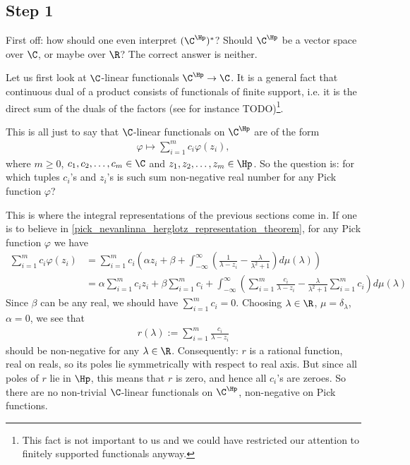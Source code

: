 \subsection{Step 1}\label{step_1}

First off: how should one even interpret $(\C^{\Hp})^{*}$? Should $\C^{\Hp}$ be a vector space over $\C$, or maybe over $\R$? The correct answer is neither.

Let us first look at $\C$-linear functionals $\C^{\Hp} \to \C$. It is a general fact that continuous dual of a product consists of functionals of finite support, i.e. it is the direct sum of the duals of the factors (see for instance TODO)\footnote{This fact is not important to us and we could have restricted our attention to finitely supported functionals anyway.}.

This is all just to say that $\C$-linear functionals on $\C^{\Hp}$ are of the form
\begin{align*}
	\varphi \mapsto \sum_{i = 1}^{m} c_{i} \varphi(z_{i}),
\end{align*}
where $m \geq 0$, $c_{1}, c_{2}, \ldots, c_{m} \in \C$ and $z_{1}, z_{2}, \ldots, z_{m} \in \Hp$. So the question is: for which tuples $c_{i}$'s and $z_{i}$'s is such sum non-negative real number for any Pick function $\varphi$?

This is where the integral representations of the previous sections come in. If one is to believe in \ref{pick_nevanlinna_herglotz_representation_theorem}, for any Pick function $\varphi$ we have
\begin{align*}
	\sum_{i = 1}^{m} c_{i} \varphi(z_{i}) &= \sum_{i = 1}^{m} c_{i} \left(\alpha z_{i} + \beta + \int_{-\infty}^{\infty} \left(\frac{1}{\lambda - z_{i}} - \frac{\lambda}{\lambda^2 + 1}\right) d \mu(\lambda)\right) \\
	&= \alpha \sum_{i = 1}^{m} c_{i} z_{i} + \beta \sum_{i = 1}^{m} c_{i} + \int_{-\infty}^{\infty} \left( \sum_{i = 1}^{m}\frac{c_{i}}{\lambda - z_{i}} - \frac{\lambda}{\lambda^2 + 1} \sum_{i = 1}^{m} c_{i} \right) d \mu(\lambda)
\end{align*}
Since $\beta$ can be any real, we should have $\sum_{i = 1}^{m} c_{i} = 0$. Choosing $\lambda \in \R$, $\mu = \delta_{\lambda}$, $\alpha = 0$, we see that
\begin{align*}
	r(\lambda) := \sum_{i = 1}^{m}\frac{c_{i}}{\lambda - z_{i}}
\end{align*}
should be non-negative for any $\lambda \in \R$. Consequently: $r$ is a rational function, real on reals, so its poles lie symmetrically with respect to real axis. But since all poles of $r$ lie in $\Hp$, this means that $r$ is zero, and hence all $c_{i}$'s are zeroes. So there are no non-trivial $\C$-linear functionals on $\C^{\Hp}$, non-negative on Pick functions.

